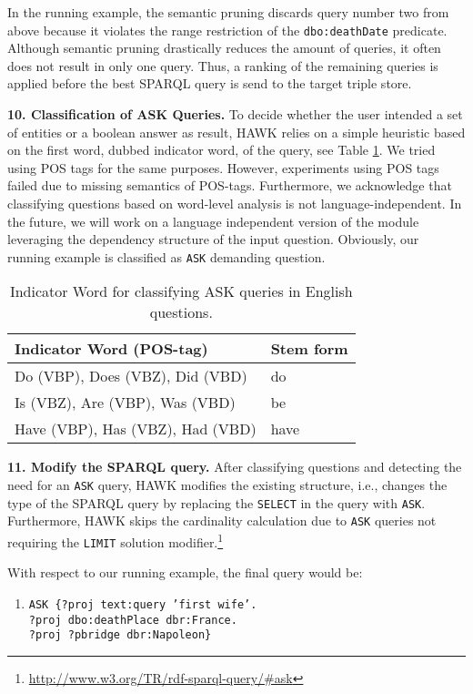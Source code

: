In the running example, the semantic pruning discards query number two from above because it violates the range restriction of the \texttt{dbo:deathDate} predicate.
Although semantic pruning drastically reduces the amount of queries, it often does not result in only one query. 
Thus, a ranking of the remaining queries is applied before the best SPARQL query is send to the target triple store.

\textbf{10. Classification of ASK Queries.}
To decide whether the user intended a set of entities or a boolean answer as result, HAWK relies on a simple heuristic based on the first word, dubbed indicator word, of the query, see Table \ref{tab:indicator_words}. 
We tried using POS tags for the same purposes. However, experiments using POS tags failed due to missing semantics of POS-tags. 
Furthermore, we acknowledge that classifying questions based on word-level analysis is not language-independent. 
In the future, we will work on a language independent version of the module leveraging the dependency structure of the input question. 
Obviously, our running example is classified as \texttt{ASK} demanding question.

\begin{table}[htb!]
\centering
\caption{Indicator Word for classifying ASK queries in English questions.}
\label{tab:indicator_words}
\begin{tabular}{@{}ll@{}}
\toprule
\textbf{Indicator Word (POS-tag)} & \textbf{Stem form}\\ \midrule
Do (VBP), Does (VBZ), Did (VBD) & do      \\
Is (VBZ), Are (VBP), Was (VBD)  & be        \\
Have (VBP), Has (VBZ), Had (VBD)& have     \\
 \bottomrule
\end{tabular}
\end{table} 

\textbf{11. Modify the SPARQL query.}
After classifying questions  and detecting the need for an \texttt{ASK} query, HAWK modifies the existing structure, i.e., changes the type of the SPARQL query by replacing the \texttt{SELECT} in the query with \texttt{ASK}.
Furthermore, HAWK skips the cardinality calculation due to \texttt{ASK} queries not requiring the \texttt{LIMIT} solution modifier.\footnote{\url{http://www.w3.org/TR/rdf-sparql-query/\#ask}} 

With respect to our running example, the final query would be: 
\begin{enumerate}
\item \texttt{ASK \{?proj text:query 'first wife'.\\ ?proj dbo:deathPlace dbr:France.\\ ?proj ?pbridge dbr:Napoleon\}}
\end{enumerate}

